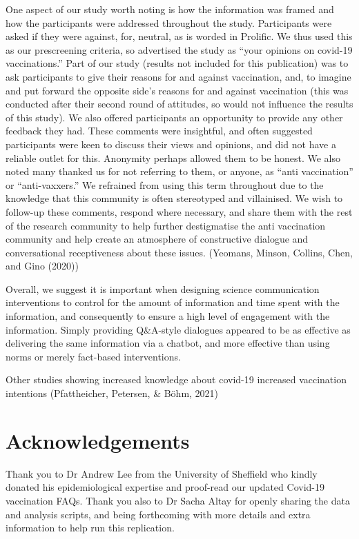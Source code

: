 \documentclass[
  english,
  ,jou,floatsintext]{apa6}
\begin{document}
One aspect of our study worth noting is how the information was framed and how the participants were addressed throughout the study. Participants were asked if they were against, for, neutral, as is worded in Prolific. We thus used this as our prescreening criteria, so advertised the study as ``your opinions on covid-19 vaccinations.'' Part of our study (results not included for this publication) was to ask participants to give their reasons for and against vaccination, and, to imagine and put forward the opposite side's reasons for and against vaccination (this was conducted after their second round of attitudes, so would not influence the results of this study). We also offered participants an opportunity to provide any other feedback they had. These comments were insightful, and often suggested participants were keen to discuss their views and opinions, and did not have a reliable outlet for this. Anonymity perhaps allowed them to be honest. We also noted many thanked us for not referring to them, or anyone, as ``anti vaccination'' or ``anti-vaxxers.'' We refrained from using this term throughout due to the knowledge that this community is often stereotyped and villainised. We wish to follow-up these comments, respond where necessary, and share them with the rest of the research community to help further destigmatise the anti vaccination community and help create an atmosphere of constructive dialogue and conversational receptiveness about these issues. (Yeomans, Minson, Collins, Chen, and Gino (2020))

Overall, we suggest it is important when designing science communication interventions to control for the amount of information and time spent with the information, and consequently to ensure a high level of engagement with the information. Simply providing Q\&A-style dialogues appeared to be as effective as delivering the same information via a chatbot, and more effective than using norms or merely fact-based interventions.

Other studies showing increased knowledge about covid-19 increased vaccination intentions (Pfattheicher, Petersen, \& Böhm, 2021)

\hypertarget{acknowledgements}{%
\section{Acknowledgements}\label{acknowledgements}}

Thank you to Dr Andrew Lee from the University of Sheffield who kindly donated his epidemiological expertise and proof-read our updated Covid-19 vaccination FAQs.
Thank you also to Dr Sacha Altay for openly sharing the data and analysis scripts, and being forthcoming with more details and extra information to help run this replication.
\end{document}
